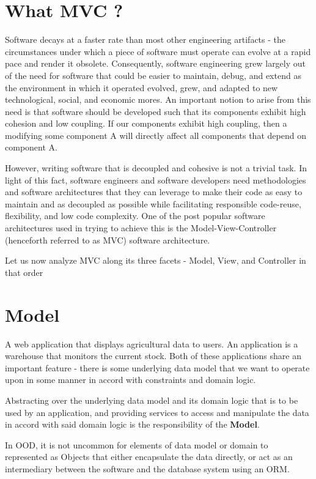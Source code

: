 
\section{What MVC ?}

Software decays at a faster rate than most other engineering artifacts - the circumstances under which a piece of software must operate can evolve at a rapid pace and render it obsolete. Consequently, software engineering grew largely out of the need for software that could be easier to maintain, debug, and extend as the environment in which it operated evolved, grew, and adapted to new technological, social, and economic mores. An important notion to arise from this need is that software should be developed such that its components exhibit high cohesion and low coupling. If our components exhibit high coupling, then a modifying some component A will directly affect all components that depend on component A.

However, writing software that is decoupled and cohesive is not a trivial task. In light of this fact, software engineers and software developers need methodologies and software architectures that they can leverage to make their code as easy to maintain and as decoupled as possible  while facilitating responsible code-reuse, flexibility, and low code complexity. One of the post popular software architectures used in trying to achieve this is the Model-View-Controller (henceforth referred to as MVC) software architecture.

Let us now analyze MVC along its three facets - Model, View, and Controller in that order

\section{Model}

A web application that displays agricultural data to users. An application is a warehouse that monitors the current stock. Both of these applications share an important feature - there is some underlying data model that we want to operate upon in some manner in accord with constraints and  domain logic. 

Abstracting over the underlying data model and its domain logic that is to be used by an application, and providing services to access and manipulate the data in accord with said domain logic is the responsibility of the \textbf{Model}.

In OOD, it is not uncommon for elements of data model or domain to represented as Objects that either encapsulate the data directly, or act as an intermediary between the software and the database system using an ORM.


